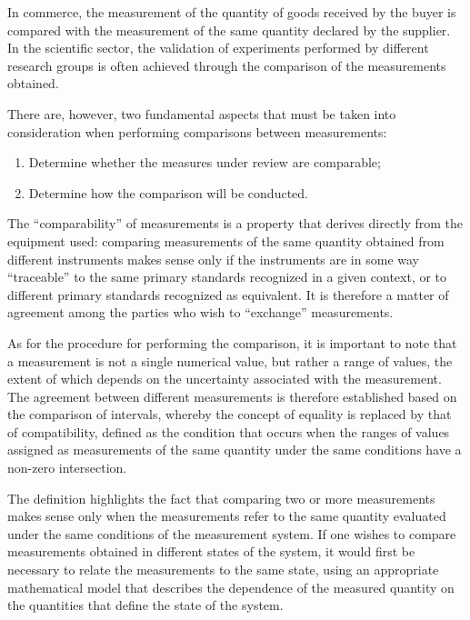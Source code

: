 \documentclass[../main.tex]{subfiles}
\begin{document}
In commerce, the measurement of the quantity of goods received by the buyer is compared with the measurement of the same quantity declared by the supplier. In the scientific sector, the validation of experiments performed by different research groups is often achieved through the comparison of the measurements obtained. 

There are, however, two fundamental aspects that must be taken into consideration when performing comparisons between measurements:

\begin{enumerate}
	\item[\textbf{-}] Determine whether the measures under review are comparable;
	\item[\textbf{-}] Determine how the comparison will be conducted.
\end{enumerate}


The “comparability” of measurements is a property that derives directly from the equipment used: comparing measurements of the same quantity obtained from different instruments makes sense only if the instruments are in some way “traceable” to the same primary standards recognized in a given context, or to different primary standards recognized as equivalent. It is therefore a matter of agreement among the parties who wish to “exchange” measurements.

As for the procedure for performing the comparison, it is important to note that a measurement is not a single numerical value, but rather a range of values, the extent of which depends on the uncertainty associated with the measurement. The agreement between different measurements is therefore established based on the comparison of intervals, whereby the concept of equality is replaced by that of compatibility,  defined as the condition that occurs when the ranges of values assigned as measurements of the same quantity under the same conditions have a non-zero intersection.

The definition highlights the fact that comparing two or more measurements makes sense only when the measurements refer to the same quantity evaluated under the same conditions of the measurement system.  If one wishes to compare measurements obtained in different states of the system, it would first be necessary to relate the measurements to the same state, using an appropriate mathematical model that describes the dependence of the measured quantity on the quantities that define the state of the system.\\
\end{document}
